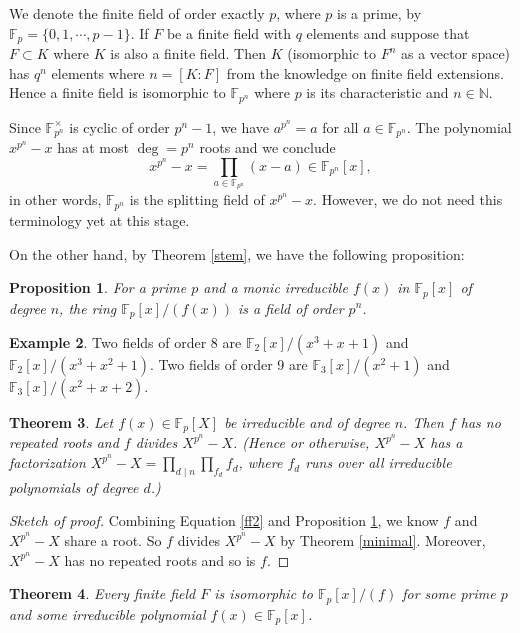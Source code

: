 \documentclass[12pt]{report}
\newtheorem{theorem}{Theorem}[section]
\newtheorem{proposition}[theorem]{Proposition}
{\theoremstyle{remark}\newtheorem*{remark}{Remark}}
\theoremstyle{definition}
\newtheorem{example}[theorem]{Example}
\newcommand{\NN}{\mathbb{N}}
\newcommand{\FF}{\mathbb{F}}
\begin{document}
We denote the finite field of order exactly $p$, where $p$ is a prime, by $\FF_p=\{0,1,\cdots,p-1\}$. If $F$ be a finite field with $q$ elements and suppose that $F \subset K$ where $K$ is also a finite field. Then $K$ (isomorphic to $F^n$ as a vector space) has $q^n$ elements where $n = [K:F]$ from the knowledge on finite field extensions. Hence a finite field is isomorphic to $\FF_{p^n}$ where $p$ is its characteristic and $n\in \NN$.

Since $\FF_{p^n}^\times$ is cyclic of order $p^n-1$, we have $a^{p^n} = a$ for all $a\in \FF_{p^n}$. The polynomial $x^{p^n}-x$ has at most $\deg =  p^n$ roots and we conclude
\begin{equation}\label{ff2}
	x^{p^n}-x = \prod_{a\in \FF_{p^n}} (x-a) \in \FF_{p^n}[x],
\end{equation}
in other words, $\FF_{p^n}$ is the splitting field of $x^{p^n}-x$. However, we do not need this terminology yet at this stage.


On the other hand, by Theorem \ref{stem}, we have the following proposition:

\begin{proposition}\label{ff3}
	For a prime $p$ and a monic irreducible $f(x)$ in $\FF_p[x]$ of degree $n$, the ring $\FF_p[x]/(f(x))$ is a field of order $p^n$.
\end{proposition}

\begin{example}
	Two fields of order 8 are $\FF_2[x]/(x^3+x+1)$ and $\FF_2[x]/(x^3+x^2+1)$. Two fields of order 9 are $\FF_3[x]/(x^2+1)$ and $\FF_3[x]/(x^2+x+2)$.
\end{example}

\begin{theorem}\label{ff1}
	Let $f(x)\in \FF_p[X]$ be irreducible and of degree $n$. Then $f$ has no repeated roots and $f$ divides $X^{p^n}-X$. (Hence or otherwise, $X^{p^n} -X$ has a factorization $X^{p^n}-X =  \prod_{d\mid n}\prod_{f_d} f_d$, where $f_d$ runs over all irreducible polynomials of degree $d$.)
\end{theorem}

\begin{proof}[Sketch of proof]
	Combining Equation \ref{ff2} and Proposition \ref{ff3}, we know $f$ and $X^{p^n}-X$ share a root. So $f$ divides $X^{p^n}-X$ by Theorem \ref{minimal}. Moreover, $X^{p^n}-X$ has no repeated roots and so is $f$.
\end{proof}

\begin{theorem}
	Every finite field $F$ is isomorphic to $\FF_p[x]/(f)$ for some prime $p$ and some irreducible polynomial $f(x)\in \FF_p[x]$.
\end{theorem}
\end{document}
